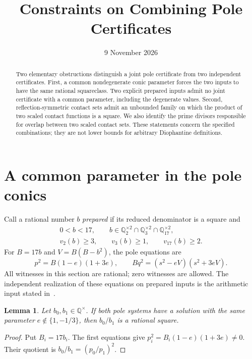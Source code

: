 \documentclass[11pt,a4paper]{article}
\title{Constraints on Combining Pole Certificates}
\author{}\date{9 November 2026}
\newtheorem{lemma}[theorem]{Lemma}
\newcommand{\Q}{\mathbb Q}
\begin{document}
\maketitle
\begin{abstract}
Two elementary obstructions distinguish a joint pole certificate from
two independent certificates. First, a common nondegenerate conic
parameter forces the two inputs to have the same rational squareclass.
Two explicit prepared inputs admit no joint certificate with a common
parameter, including the degenerate values. Second, reflection-symmetric
contact sets admit an unbounded family on which the product of two
scaled contact functions is a square. We also identify the prime
divisors responsible for overlap between two scaled contact sets.
These statements concern the specified combinations; they are not
lower bounds for arbitrary Diophantine definitions.
\end{abstract}

\section{A common parameter in the pole conics}

Call a rational number $b$ \emph{prepared} if its reduced denominator
is a square and
\[
 \begin{gathered}
 0<b<17,\qquad
 b\in\Q_2^{\times2}\cap\Q_3^{\times2}\cap\Q_{17}^{\times2},\\
 v_2(b)\ge3,\qquad v_3(b)\ge1,\qquad v_{17}(b)\ge2.
 \end{gathered}
\]
For $B=17b$ and $V=B(B-b^2)$, the pole equations are
\begin{equation}\label{eq:pole}
 p^2=B(1-e)(1+3e),\qquad
 Bq^2=(s^2-eV)(s^2+3eV).
\end{equation}
All witnesses in this section are rational; zero witnesses are allowed.
The independent realization of these equations on prepared inputs is
the arithmetic input stated in~\cite{Dependencies}.

\begin{lemma}\label{lem:squareclass}
Let $b_0,b_1\in\Q^\times$. If both pole systems have a solution
with the same parameter $e\notin\{1,-1/3\}$, then $b_0/b_1$ is
a rational square.
\end{lemma}
\begin{proof}
Put $B_i=17b_i$. The first equations give
$p_i^2=B_i(1-e)(1+3e)\ne0$. Their quotient is
$b_0/b_1=(p_0/p_1)^2$.
\end{proof}
\end{document}

